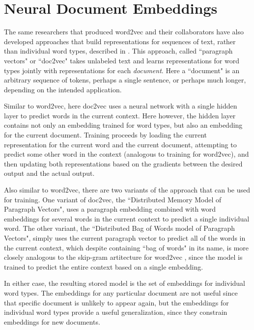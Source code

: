 
\section{Neural Document Embeddings}
The same researchers that produced word2vec and their collaborators have also
developed approaches that build representations for sequences of text, rather
than individual word types, described in
\cite{dai-document-embedding-2015,quocle-distributed-representations-2014}.
This approach, called ``paragraph vectors" or ``doc2vec" takes unlabeled text
and learns representations for word types jointly with representations for each
\emph{document}. Here a ``document" is an arbitrary sequence of tokens, perhaps
a single sentence, or perhaps much longer, depending on the intended
application.

Similar to word2vec, here doc2vec uses a neural network with a single hidden
layer to predict words in the current context. Here however, the hidden layer
contains not only an embedding trained for word types, but also an embedding
for the current document. Training proceeds by loading the current
representation for the current word and the current document, attempting to
predict some other word in the context (analogous to training for word2vec),
and then updating both representations based on the gradients between the
desired output and the actual output. 

Also similar to word2vec, there are two variants of the approach that can be
used for training. One variant of doc2vec, the ``Distributed Memory Model of
Paragraph Vectors", uses a paragraph embedding combined with word embeddings
for several words in the current context to predict a single individual word.
The other variant, the ``Distributed Bag of Words model of Paragraph Vectors",
simply uses the current paragraph vector to predict all of the words in the
current context, which despite containing ``bag of words" in its name, is more
closely analogous to the skip-gram artitecture for word2vec
\cite{quocle-distributed-representations-2014}, since the model is trained to
predict the entire context based on a single embedding.

In either case, the resulting stored model is the set of embeddings for
individual word types. The embeddings for any particular document are not
useful since that specific document is unlikely to appear again, but the
embeddings for individual word types provide a useful generalization, since
they constrain embeddings for new documents.

